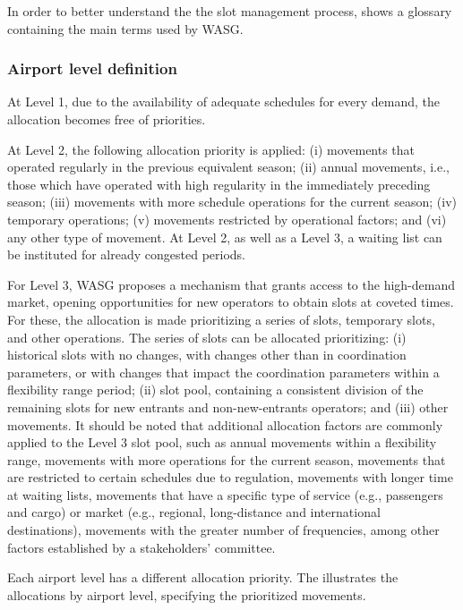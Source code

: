 In order to better understand the the slot management process,  shows a glossary containing the main terms used by \acrshort{WASG}.



\subsubsection{Airport level definition}

At Level 1, due to the availability of adequate schedules for every demand, the allocation becomes free of priorities.

At Level 2, the following allocation priority is applied: (i) movements that operated regularly in the previous equivalent season; (ii) annual movements, i.e., those which have operated with high regularity in the immediately preceding season; (iii) movements with more schedule operations for the current season; (iv) temporary operations; (v) movements restricted by operational factors; and (vi) any other type of movement. At Level 2, as well as a Level 3, a waiting list can be instituted for already congested periods.

For Level 3, \acrshort{WASG} proposes a mechanism that grants access to the high-demand market, opening opportunities for new operators to obtain slots at coveted times. For these, the allocation is made prioritizing a series of slots, temporary slots, and other operations. The series of slots can be allocated prioritizing: (i) historical slots with no changes, with changes other than in coordination parameters, or with changes that impact the coordination parameters within a flexibility range period; (ii) slot pool, containing a consistent division of the remaining slots for new entrants and non-new-entrants operators; and (iii) other movements. It should be noted that additional allocation factors are commonly applied to the Level 3 slot pool, such as annual movements within a flexibility range, movements with more operations for the current season, movements that are restricted to certain schedules due to regulation, movements with longer time at waiting lists, movements that have a specific type of service (e.g., passengers and cargo) or market (e.g., regional, long-distance and international destinations), movements with the greater number of frequencies, among other factors established by a stakeholders' committee.

Each airport level has a different allocation priority. The  illustrates the allocations by airport level, specifying the prioritized movements.

